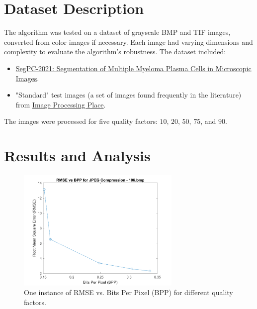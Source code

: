 \documentclass{article}
\begin{document}

\section{Dataset Description}
The algorithm was tested on a dataset of grayscale BMP and TIF images, converted from color images if necessary. Each image had varying dimensions and complexity to evaluate the algorithm's robustness. The dataset included:
\begin{itemize}
    \item \href{https://www.kaggle.com/datasets/sbilab/segpc2021dataset}{SegPC-2021: Segmentation of Multiple Myeloma Plasma Cells in Microscopic Images}.
    \item "Standard" test images (a set of images found frequently in the literature) from \href{https://www.imageprocessingplace.com/root_files_V3/image_databases.htm}{Image Processing Place}.
\end{itemize}

The images were processed for five quality factors: $10$, $20$, $50$, $75$, and $90$.

\section{Results and Analysis}
\begin{figure}[!htb]
    \centering
    \includegraphics[width=0.7\textwidth]{images/106_rmse_vs_bpp.png}
    \caption{One instance of RMSE vs. Bits Per Pixel (BPP) for different quality factors.}
    \label{fig:rmse_bpp_plot}
\end{figure}
\end{document}
